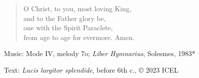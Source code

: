 \hymn



\setlength{\vleftmargin}{2em}
\begin{verse}
  O Christ, to you, most loving King,\\ 
  and to the Father glory be,\\ 
  one with the Spirit Paraclete,\\
  from age to age for evermore. Amen.
\end{verse}
\setlength{\vleftmargin}{\defleftmargini}

\begin{hymnsource}
Music: Mode IV, melody 7o; \emph{Liber Hymnarius}, Solesmes, 1983*

Text: \emph{Lucis largitor splendide}, before 6th c., © 2023 ICEL
\end{hymnsource}
